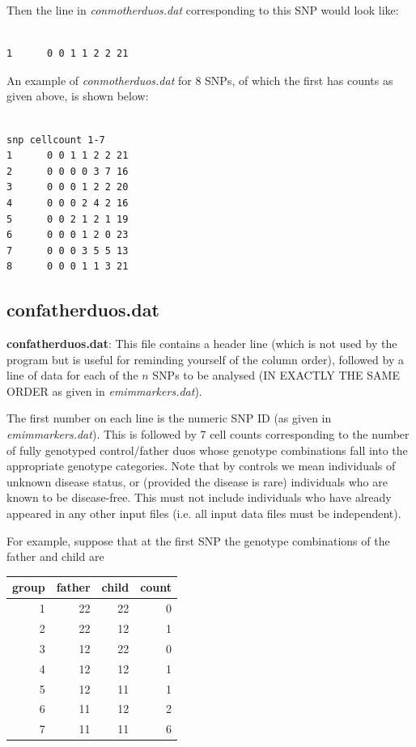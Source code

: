 \documentclass[a4paper,12pt]{article}
\begin{document}
Then the line in {\it conmotherduos.dat} corresponding to this SNP would look like: 
\vspace{0.35cm} \begin{lstlisting}

1      0 0 1 1 2 2 21

\end{lstlisting} \vspace{0.35cm}
An example of {\it conmotherduos.dat} for 8 SNPs, of which the first has counts as given above, is shown below: 
\vspace{0.35cm} \begin{lstlisting}

snp cellcount 1-7
1      0 0 1 1 2 2 21
2      0 0 0 0 3 7 16
3      0 0 0 1 2 2 20
4      0 0 0 2 4 2 16
5      0 0 2 1 2 1 19
6      0 0 0 1 2 0 23
7      0 0 0 3 5 5 13
8      0 0 0 1 1 3 21

\end{lstlisting} \vspace{0.35cm}

\subsection{confatherduos.dat}
\label{confatherduos}

{\bf confatherduos.dat}: This file contains a header line (which is not used by the program but is useful for reminding yourself of the column order), followed by a line of data for each of the $n$ SNPs to be analysed (IN EXACTLY THE SAME ORDER as given in {\it emimmarkers.dat}). 

The first number on each line is the numeric SNP ID (as given in {\it emimmarkers.dat}). This is followed by 7 cell counts corresponding to the number of fully genotyped control/father duos whose genotype combinations fall into the appropriate genotype categories. Note that by controls we mean individuals of unknown disease status, or (provided the disease is rare) individuals who are known to be disease-free. This must not include individuals who have already appeared in any other input files (i.e. all input data files must be independent). 

For example, suppose that at the first SNP the genotype combinations of the father and child are 

{\begin{center}\begin{tabular}{rrrr}
group  & father  & child  & count\\
\hline
1  & 22  & 22  & 0\\
2  & 22  & 12  & 1\\
3  & 12  & 22  & 0\\
4  & 12  & 12  & 1\\
5  & 12  & 11  & 1\\
6  & 11  & 12  & 2\\
7  & 11  & 11  & 6\\
\end{tabular}\end{center}}
\end{document}
